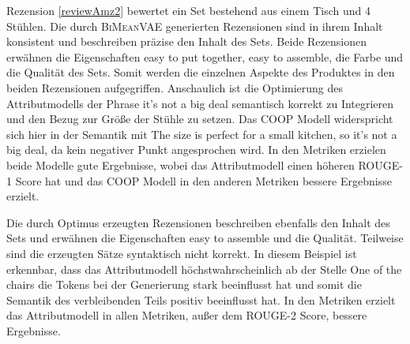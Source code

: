 Rezension \ref{reviewAmz2} bewertet ein Set bestehend aus einem Tisch und 4 Stühlen.
Die durch \textsc{BiMeanVAE} generierten Rezensionen sind in ihrem Inhalt konsistent und beschreiben präzise den Inhalt des Sets.
Beide Rezensionen erwähnen die Eigenschaften \glqq{}easy to put together\grqq{}, \glqq{}easy to assemble\grqq{}, die Farbe und die Qualität des Sets.
Somit werden die einzelnen Aspekte des Produktes in den beiden Rezensionen aufgegriffen.
Anschaulich ist die Optimierung des Attributmodells der Phrase \glqq{}it's not a big deal\grqq{} semantisch korrekt zu Integrieren und den Bezug zur Größe der Stühle zu setzen.
Das COOP Modell widerspricht sich hier in der Semantik mit \glqq{}The size is perfect for a small kitchen, so it's not a big deal\grqq{}, da kein negativer Punkt angesprochen wird.
In den Metriken erzielen beide Modelle gute Ergebnisse, wobei das Attributmodell einen höheren ROUGE-1 Score hat und das COOP Modell in den anderen Metriken bessere Ergebnisse erzielt.

Die durch Optimus erzeugten Rezensionen beschreiben ebenfalls den Inhalt des Sets und erwähnen die Eigenschaften \glqq{}easy to assemble\grqq{} und die Qualität.
Teilweise sind die erzeugten Sätze syntaktisch nicht korrekt. 
In diesem Beispiel ist erkennbar, dass das Attributmodell höchstwahrscheinlich ab der Stelle \glqq{}One of the chairs\grqq{} die Tokens bei der Generierung stark beeinflusst hat und somit die Semantik des verbleibenden Teils positiv beeinflusst hat.
In den Metriken erzielt das Attributmodell in allen Metriken, außer dem ROUGE-2 Score, bessere Ergebnisse.

